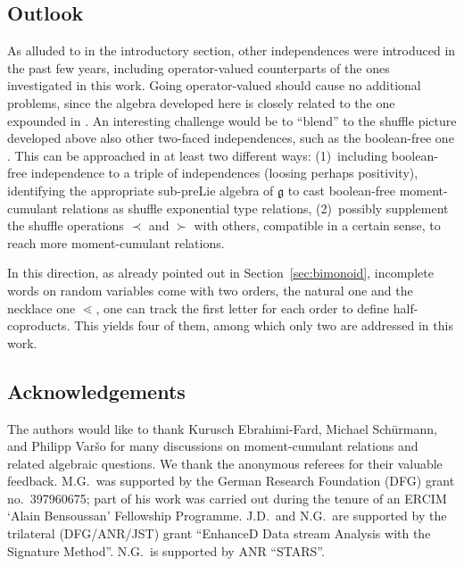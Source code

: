 \documentclass[pdftex]{sigma}
\newcommand{\stdl}{\lessdot}
\numberwithin{equation}{section}
\begin{document}
\subsection{Outlook}

As alluded to in the introductory section, other independences were introduced in the past few years, including operator-valued counterparts of the
ones investigated in this work. %
Going operator-valued should cause no additional problems,
since the algebra developed here is closely related to the one expounded in \cite{gilliers2020operator}.
An interesting challenge would be to ``blend'' to the shuffle picture developed above also other two-faced independences,
such as the boolean-free one \cite{liu2019}.
This can be approached in at least two different ways:
(1)~including boolean-free independence to a triple of
independences (loosing perhaps positivity), identifying the appropriate sub-preLie algebra of $\mathfrak{g}$ to cast boolean-free moment-cumulant relations as shuffle exponential type relations,
(2)~possibly supplement the shuffle operations $\prec$ and $\succ$ with others, compatible in a certain sense, to reach more moment-cumulant relations.

In this direction, as already pointed out in Section~\ref{sec:bimonoid}, incomplete
words on random variables come with two orders, the natural one and the
necklace one $\stdl$, one can track the first letter for each order to define
half-coproducts.
This yields four of them, among which only two are addressed in this work.

\subsection*{Acknowledgements}
The authors would like to thank Kurusch Ebrahimi-Fard, Michael Sch\"urmann, and Philipp Var\v{s}o for many discussions on moment-cumulant relations and related algebraic questions. We thank the anonymous referees for their valuable feedback. M.G.~was supported by the German Research Foundation (DFG) grant no.~397960675; part of his work was carried out during the tenure of an ERCIM ‘Alain
Bensoussan’ Fellowship Programme.
J.D.~and N.G.~are supported by the trilateral (DFG/ANR/JST) grant ``EnhanceD Data stream Analysis with the Signature Method''. N.G.~is supported by ANR ``STARS''.
\end{document}
